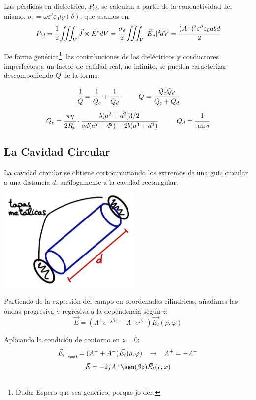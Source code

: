 \documentclass[12pt]{article}
\begin{document}
Las p\'erdidas en diel\'ectrico, $P_{ld}$, se calculan a partir de la conductividad del mismo, $\sigma_e = \omega\varepsilon' \varepsilon_0 tg(\delta)$, que usamos en:
$$P_{ld} = \cfrac{1}{2}\iiint_V \vec{J}\times\vec{E}^* dV = \cfrac{\sigma_e}{2}\iiint_V |\vec{E}_y|^2 dV = \cfrac{(A^+)^2 \varepsilon ''\varepsilon_0 a b d}{2}$$

De forma gen\'erica\footnote{Duda: Espero que sea gen\'erico, porque jo-der.}, las contribuciones de los diel\'ectricos y conductores imperfectos a un factor de calidad real, no infinito, se pueden caracterizar descomponiendo $Q$ de la forma:

$$\cfrac{1}{Q} = \cfrac{1}{Q_c} +\cfrac{1}{Q_d} \hspace{1cm} Q= \cfrac{Q_cQ_d}{Q_c + Q_d}$$

$$Q_c = \cfrac{\pi\eta}{2R_s} \cdot \cfrac{b(a^2+d^2){3/2}}{ad(a^2+d^2) + 2b(a^3+d^3)} \hspace{1cm} Q_d = \cfrac{1}{\tan\delta}$$


\subsection{La Cavidad Circular}

La cavidad circular se obtiene cortocircuitando los extremos de una gu\'ia circular a una distancia $d$, an\'alogamente a la cavidad rectangular.
\begin{center}
	\includegraphics[width=7cm]{img/Cavidad_circular.jpg}
\end{center}

Partiendo de la expresi\'on del campo en coordenadas cil\'indricas, a\~nadimos las ondas progresiva y regresiva a la dependencia seg\'un $z$:
$$\vec{E} = (A^+ e^{-j\beta z} - A^+ e^{j\beta z}) \vec{E_t} (\rho, \varphi)$$

Aplicando la condici\'on de contorno en $z = 0$:
$$\vec{E}_t \big|_{z=0} = (A^+ + A^-) \vec{E_t} (\rho, \varphi) \hspace{0.3cm} \rightarrow \hspace{0.3cm} A^+ = -A^-$$
$$\vec{E} = -2jA^+ \sen(\beta z) \vec{E}_t (\rho, \varphi)$$
\end{document}

